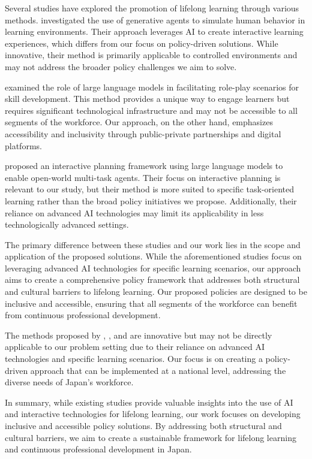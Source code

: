 \documentclass{article} %
\begin{document}
Several studies have explored the promotion of lifelong learning through various methods. \citet{park2023generative} investigated the use of generative agents to simulate human behavior in learning environments. Their approach leverages AI to create interactive learning experiences, which differs from our focus on policy-driven solutions. While innovative, their method is primarily applicable to controlled environments and may not address the broader policy challenges we aim to solve.

\citet{shanahan2023role} examined the role of large language models in facilitating role-play scenarios for skill development. This method provides a unique way to engage learners but requires significant technological infrastructure and may not be accessible to all segments of the workforce. Our approach, on the other hand, emphasizes accessibility and inclusivity through public-private partnerships and digital platforms.

\citet{wang2023describe} proposed an interactive planning framework using large language models to enable open-world multi-task agents. Their focus on interactive planning is relevant to our study, but their method is more suited to specific task-oriented learning rather than the broad policy initiatives we propose. Additionally, their reliance on advanced AI technologies may limit its applicability in less technologically advanced settings.

The primary difference between these studies and our work lies in the scope and application of the proposed solutions. While the aforementioned studies focus on leveraging advanced AI technologies for specific learning scenarios, our approach aims to create a comprehensive policy framework that addresses both structural and cultural barriers to lifelong learning. Our proposed policies are designed to be inclusive and accessible, ensuring that all segments of the workforce can benefit from continuous professional development.

The methods proposed by \citet{park2023generative}, \citet{shanahan2023role}, and \citet{wang2023describe} are innovative but may not be directly applicable to our problem setting due to their reliance on advanced AI technologies and specific learning scenarios. Our focus is on creating a policy-driven approach that can be implemented at a national level, addressing the diverse needs of Japan's workforce.

In summary, while existing studies provide valuable insights into the use of AI and interactive technologies for lifelong learning, our work focuses on developing inclusive and accessible policy solutions. By addressing both structural and cultural barriers, we aim to create a sustainable framework for lifelong learning and continuous professional development in Japan.
\end{document}
